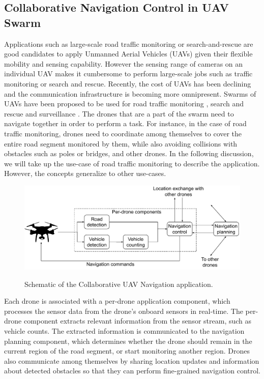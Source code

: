 \subsection{Collaborative Navigation Control in UAV Swarm}
Applications such as large-scale road traffic monitoring or search-and-rescue are good candidates to apply Unmanned Aerial Vehicles (UAVs) given their flexible mobility and sensing capability. However the sensing range of cameras on an individual UAV makes it cumbersome to perform large-scale jobs such as traffic monitoring or search and rescue. Recently, the cost of UAVs has been declining and the communication infrastructure is becoming more omnipresent. Swarms of UAVs have been proposed to be used for road traffic monitoring \cite{huang2021decentralized}, search and rescue \cite{scherer2015autonomous} and surveillance \cite{meng2015skystitch}. The drones that are a part of the swarm need to navigate together in order to perform a task. For instance, in the case of road traffic monitoring, drones need to coordinate among themselves to cover the entire road segment monitored by them, while also avoiding collisions with obstacles such as poles or bridges, and other drones. In the following discussion, we will take up the use-case of road traffic monitoring to describe the application. However, the concepts generalize to other use-cases.

\begin{figure}[h]
\centering
\includegraphics[width=0.75\columnwidth]{figures/apps/collab_drone_navigation}
\label{fig:collab_drone_navig}
\caption{Schematic of the Collaborative UAV Navigation application.}
\end{figure}

\par Each drone is associated with a per-drone application component, which processes the sensor data from the drone's onboard sensors in real-time. The per-drone component extracts relevant information from the sensor stream, such as vehicle counts. The extracted information is communicated to the navigation planning component, which determines whether the drone should remain in the current region of the road segment, or start monitoring another region. Drones also communicate among themselves by sharing location updates and information about detected obstacles so that they can perform fine-grained navigation control.

